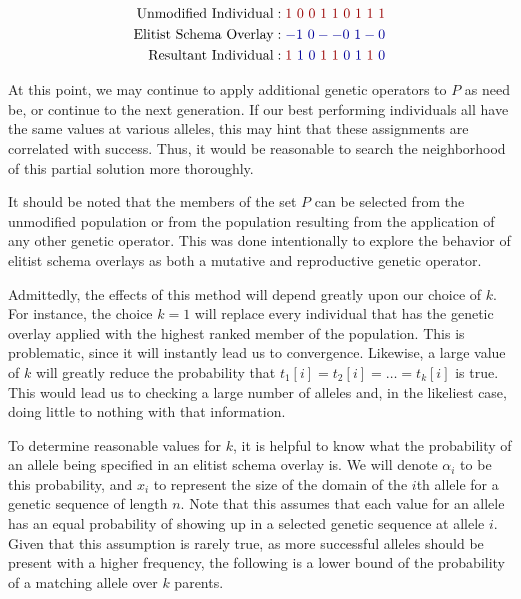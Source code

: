 \begin{figure}[h!]
\centering 
\begin{align*}
\text{Unmodified Individual} &: {\color{myred}1~0~0~1~1~0~1~1~1}		\\	
\text{Elitist Schema Overlay} &:   {\color{myblue}-1~0--0~1-0	}		\\  	
\text{Resultant Individual} &:  {\color{myred}1}~{\color{myblue}1~0}~ {\color{myred}1~1}~{\color{myblue}0~1}~ {\color{myred}1}~{\color{myblue}0}
\end{align*}
\end{figure}

At this point, we may continue to apply additional genetic operators to $P$ as need be, or continue to the next generation. If our best performing individuals all have the same values at various alleles, this may hint that these assignments are correlated with success. Thus, it would be reasonable to search the neighborhood of this partial solution more thoroughly. 

It should be noted that the members of the set $P$ can be selected from the unmodified population or from the population resulting from the application of any other genetic operator. This was done intentionally to explore the behavior of elitist schema overlays as both a mutative and reproductive genetic operator. 

Admittedly, the effects of this method will depend greatly upon our choice of $k$. For instance, the choice $k = 1$ will replace every individual that has the genetic overlay applied with the highest ranked member of the population. This is problematic, since it will instantly lead us to convergence. Likewise, a large value of $k$ will greatly reduce the probability that $t_1[i] = t_2[i] = \ldots = t_k[i]$ is true. This would lead us to checking a large number of alleles and, in the likeliest case, doing little to nothing with that information.

To determine reasonable values for $k$, it is helpful to know what the probability of an allele being specified in an elitist schema overlay is. We will denote $\alpha_i$ to be this probability, and $x_i$ to represent the size of the domain of the $i$th allele for a genetic sequence of length $n$. Note that this assumes that each value for an allele has an equal probability of showing up in a selected genetic sequence at allele $i$. Given that this assumption is rarely true, as more successful alleles should be present with a higher frequency, the following is a lower bound of the probability of a matching allele over $k$ parents.

